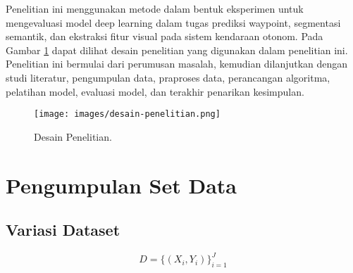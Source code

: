 

\setcounter{chapter}{3}
\setcounter{section}{0} %
\renewcommand{\thesection}{\thechapter.\arabic{section}}
Penelitian ini menggunakan metode \parencite{santoso2020implementasi} dalam bentuk eksperimen untuk mengevaluasi model deep learning dalam tugas prediksi waypoint, segmentasi semantik, dan ekstraksi fitur visual pada sistem kendaraan otonom. Pada Gambar \ref{fig:desain_penelitian} dapat dilihat desain penelitian yang digunakan dalam penelitian ini. Penelitian ini bermulai dari  perumusan masalah, kemudian dilanjutkan dengan studi literatur, pengumpulan data, praproses data, perancangan algoritma, pelatihan model, evaluasi model, dan terakhir penarikan kesimpulan.
\vspace{1cm}
\begin{figure}[H]
    \centering
    \texttt{[image: images/desain-penelitian.png]}
    \caption{Desain Penelitian.}
    \label{fig:desain_penelitian}
\end{figure}

\section{Pengumpulan Set Data}

\subsection{Variasi Dataset}
\begin{equation}
    D = \{(X_i, Y_i)\}_{i=1}^{J}
\end{equation}


